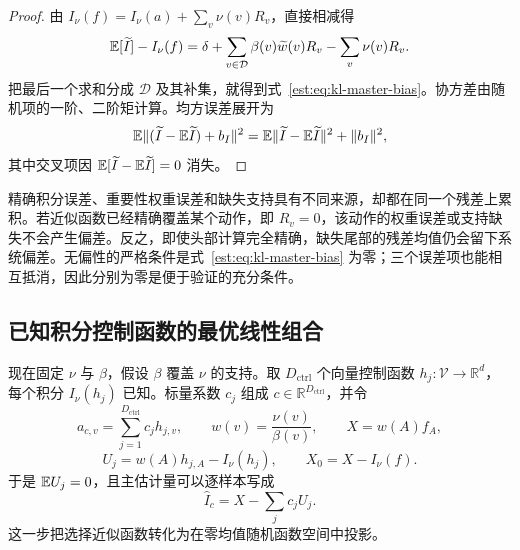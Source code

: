 \begin{proof}
由 $I_\nu(f)=I_\nu(a)+\sum_v\nu(v)R_v$，直接相减得
\begin{equation*}
 \mathbb E[\widetilde I]-I_\nu(f)
 =\delta+\sum_{v\in\mathcal D}\beta(v)\widetilde w(v)R_v-\sum_v\nu(v)R_v.
\end{equation*}
把最后一个求和分成 $\mathcal D$ 及其补集，就得到式~\eqref{est:eq:kl-master-bias}。协方差由随机项的一阶、二阶矩计算。均方误差展开为
\begin{equation*}
 \mathbb E\lVert(\widetilde I-\mathbb E\widetilde I)+b_I\rVert^2
 =\mathbb E\lVert\widetilde I-\mathbb E\widetilde I\rVert^2+\lVert b_I\rVert^2,
\end{equation*}
其中交叉项因 $\mathbb E[\widetilde I-\mathbb E\widetilde I]=0$ 消失。
\end{proof}

精确积分误差、重要性权重误差和缺失支持具有不同来源，却都在同一个残差上累积。若近似函数已经精确覆盖某个动作，即 $R_v=0$，该动作的权重误差或支持缺失不会产生偏差。反之，即使头部计算完全精确，缺失尾部的残差均值仍会留下系统偏差。无偏性的严格条件是式~\eqref{est:eq:kl-master-bias} 为零；三个误差项也能相互抵消，因此分别为零是便于验证的充分条件。

\subsection{已知积分控制函数的最优线性组合}

现在固定 $\nu$ 与 $\beta$，假设 $\beta$ 覆盖 $\nu$ 的支持。取 $D_{\mathrm{ctrl}}$ 个向量控制函数 $h_j:\mathcal V\to\mathbb R^d$，每个积分 $I_\nu(h_j)$ 已知。标量系数 $c_j$ 组成 $c\in\mathbb R^{D_{\mathrm{ctrl}}}$，并令
\begin{equation*}
 a_{c,v}=\sum_{j=1}^{D_{\mathrm{ctrl}}} c_jh_{j,v},\qquad
 w(v)=\frac{\nu(v)}{\beta(v)},\qquad X=w(A)f_A,
\end{equation*}
\begin{equation*}
 U_j=w(A)h_{j,A}-I_\nu(h_j),\qquad
 X_0=X-I_\nu(f).
\end{equation*}
于是 $\mathbb E U_j=0$，且主估计量可以逐样本写成
\begin{equation*}
 \widehat I_c=X-\sum_jc_jU_j.
\end{equation*}
这一步把选择近似函数转化为在零均值随机函数空间中投影。

